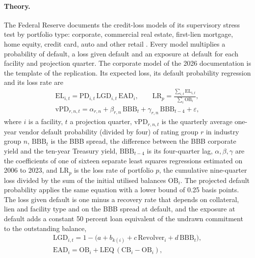 \paragraph{Theory.}
The Federal Reserve documents the credit-loss models of its supervisory stress test by portfolio type: corporate, commercial real
estate, first-lien mortgage, home equity, credit card, auto and other retail \citep{aggregation-stress:fedcredit2026}. Every
model multiplies a probability of default, a loss given default and an exposure at default for each facility and projection
quarter. The corporate model of the 2026 documentation is the template of the replication. Its expected loss, its default
probability regression and its loss rate are
\begin{equation}
\begin{gathered}
\mathrm{EL}_{i,t}=\mathrm{PD}_{i,t}\,\mathrm{LGD}_{i,t}\,\mathrm{EAD}_{i},\qquad
\mathrm{LR}_{p}=\frac{\sum_{i,t}\mathrm{EL}_{i,t}}{\sum_{i}\mathrm{OB}_{i}},\\
\mathrm{vPD}_{r,n,t}=\alpha_{r,n}+\beta_{r,n}\,\mathrm{BBB}_t+\gamma_{r,n}\,\mathrm{BBB}_{t-4}+\varepsilon,
\end{gathered}
\label{eq:fed-el}
\end{equation}
where $i$ is a facility, $t$ a projection quarter, $\mathrm{vPD}_{r,n,t}$ is the quarterly average one-year vendor default
probability (divided by four) of rating group $r$ in industry group $n$, $\mathrm{BBB}_t$ is the BBB spread, the difference
between the BBB corporate yield and the ten-year Treasury yield, $\mathrm{BBB}_{t-4}$ is its four-quarter lag, $\alpha,\beta,\gamma$ are
the coefficients of one of sixteen separate least squares regressions estimated on 2006 to 2023, and $\mathrm{LR}_p$ is the loss
rate of portfolio $p$, the cumulative nine-quarter loss divided by the sum of the initial utilised balances $\mathrm{OB}_i$. The
projected default probability applies the same equation with a lower bound of 0.25 basis points. The loss given default is one
minus a recovery rate that depends on collateral, lien and facility type and on the BBB spread at default, and the exposure at
default adds a constant 50 percent loan equivalent of the undrawn commitment to the outstanding balance,
\begin{equation}
\begin{gathered}
\mathrm{LGD}_{i,t}=1-\bigl(a+b_{k(i)}+c\,\mathrm{Revolver}_i+d\,\mathrm{BBB}_t\bigr),\\
\mathrm{EAD}_i=\mathrm{OB}_i+\mathrm{LEQ}\,(\mathrm{CB}_i-\mathrm{OB}_i),
\end{gathered}
\label{eq:fed-lgd}
\end{equation}
